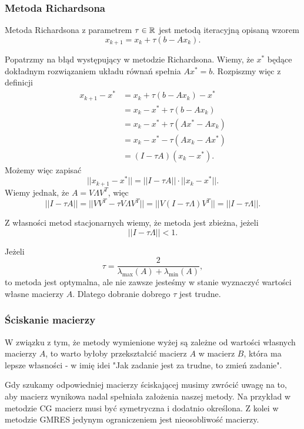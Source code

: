 \documentclass[a4paper,12pt]{article}
\newcommand{\lmax}[1]{\lambda_{\text{max}}(#1)}
\newcommand{\lmin}[1]{\lambda_{\text{min}}(#1)}
\begin{document}
\subsubsection*{Metoda Richardsona}

Metoda Richardsona z parametrem $\tau \in \mathbb{R}$ jest metodą iteracyjną opisaną wzorem
$$
    x_{k+1} = x_k + \tau (b - Ax_k).
$$

Popatrzmy na błąd występujący w metodzie Richardsona. Wiemy, że $x^*$ będące dokładnym
rozwiązaniem układu równań spełnia $Ax^* = b$. Rozpiszmy więc z definicji
\begin{align*}
    x_{k+1} - x^* & = x_k + \tau (b - Ax_k) - x^* \\
                  & = x_k - x^* + \tau (b - Ax_k)  \\
                  & = x_k - x^* + \tau (Ax^* - Ax_k) \\
                  & = x_k - x^* - \tau (Ax_k - Ax^*) \\
                  & = (I - \tau A)(x_k - x^*).
\end{align*}
Możemy więc zapisać
$$
    ||x_{k+1} - x^*|| = ||I - \tau A|| \cdot ||x_k - x^*||.
$$
Wiemy jednak, że $A = V \Lambda V^T$, więc
$$
    ||I - \tau A|| = ||VV^T - \tau V\Lambda V^T|| = ||V(I - \tau \Lambda)V^T|| = ||I - \tau \Lambda||.
$$

Z własności metod stacjonarnych wiemy, że metoda jest zbieżna, jeżeli
$$
    ||I - \tau \Lambda|| < 1.
$$

Jeżeli $$\tau = \frac{2}{\lmax{A} + \lmin{A}},$$ to metoda jest optymalna,
ale nie zawsze jesteśmy w stanie wyznaczyć wartości własne macierzy $A$.
Dlatego dobranie dobrego $\tau$ jest trudne.

\subsubsection*{Ściskanie macierzy}

W związku z tym, że metody wymienione wyżej są zależne od wartości
własnych macierzy $A$, to warto byłoby przekształcić macierz $A$ w macierz $B$,
która ma lepsze własności - w imię idei "Jak zadanie jest za trudne, to zmień zadanie".

Gdy szukamy odpowiedniej macierzy ściskającej musimy zwrócić uwagę na to,
aby macierz wynikowa nadal spełniała założenia naszej metody.
Na przykład w metodzie CG macierz musi być symetryczna i dodatnio określona.
Z kolei w metodzie GMRES jedynym ograniczeniem jest nieosobliwość macierzy.
\end{document}
